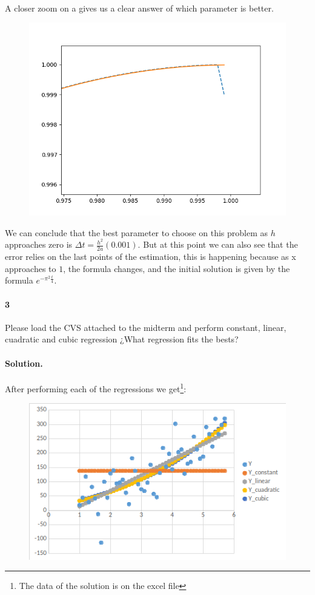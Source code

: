 \documentclass{article}
\begin{document}
\paragraph{}A closer zoom on a gives us a clear answer of which parameter is better.
\newpage
\begin{figure}[h!]
	\centering
	\includegraphics[width=0.5\linewidth]{5.png}
\end{figure}
We can conclude that the best parameter to choose on this problem as $h$ approaches zero is $\Delta t = \frac{h^2}{2a}(0.001)$. But at this point we can also see that the error relies on the last points of the estimation, this is happening because as x approaches to $1$, the formula changes, and the initial solution is given by the formula $e^{-\pi^2 \frac{t}{4}}$.
\paragraph{3} Please load the CVS attached to the midterm and perform constant, linear, cuadratic and cubic regression ¿What regression fits the bests?
\paragraph{Solution.} After performing each of the regressions we get\footnote{The data of the solution is on the excel file}:
\begin{figure}[h!]
	\centering
	\includegraphics[width=0.5\linewidth]{6.png}
\end{figure}
\end{document}

